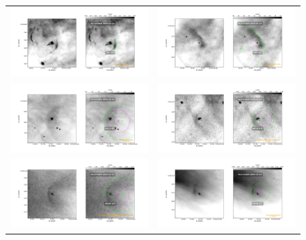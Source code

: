 \documentclass{article}
\begin{document}
\begin{figure}[htp]
\centering
\begin{tabular}{l l}
  \includegraphics[width=0.5\linewidth]{j8oc01010_wcs/180-331-Bally_01-images.pdf}
   &\includegraphics[width=0.5\linewidth]{j8oc01010_wcs/189-329-Bally_01-images.pdf}\\
   \includegraphics[width=0.5\linewidth]{j8oc01010_wcs/w012-407-Bally_01-images.pdf}
   &\includegraphics[width=0.5\linewidth]{j8oc01010_wcs/w014-414-Bally_01-images.pdf}\\
   \includegraphics[width=0.5\linewidth]{j8oc01010_wcs/w030-524-Bally_01-images.pdf}
    &\includegraphics[width=0.5\linewidth]{j8oc01010_wcs/w044-527-Bally_01-images.pdf}\\
 \end{tabular}
\end{figure}
\end{document}
